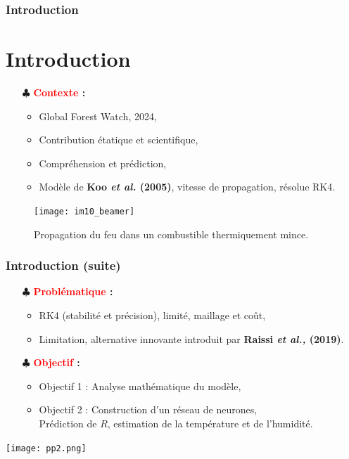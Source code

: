 \documentclass[handout]{beamer}
\newtheorem{pbm et hypo}[thm]{Problématique et hypothèses}
\begin{document}
	\begin{frame}
		\frametitle{\textbf{Introduction}}
		\section{Introduction}
		\begin{itemize}
			\item[$\clubsuit$] \textbf{\textcolor{red}{Contexte} : } 
			\begin{itemize}
				\item Global Forest Watch, 2024,  
				\item Contribution étatique et scientifique, 
				\item Compréhension et prédiction, \pause
				\item Modèle de \textbf{Koo \textit{et al.} (2005)}, vitesse de propagation, résolue RK4. 
			\end{itemize}
		\end{itemize}
		\pause[1]
		\begin{figure}
			\centering
			\texttt{[image: im10\_beamer]}
			\caption{Propagation du feu dans un combustible thermiquement mince.}
		\end{figure}
	\end{frame}
	\begin{frame}
		\frametitle{\textbf{Introduction (suite)}}
		\begin{itemize}
			\item[$\clubsuit$] \textbf{\textcolor{red}{Problématique} : } \pause
			\begin{itemize}
				\item RK4 (stabilité et précision), limité, maillage et coût, \pause
				\item Limitation, alternative innovante introduit par \textbf{Raissi \textit{et al.,} (2019)}.
			\end{itemize}
		\end{itemize}
		\vspace{1cm}
		\begin{itemize}
			\item[$\clubsuit$] \textbf{\textcolor{red}{Objectif} : } \pause
			\begin{itemize}
				\item Objectif 1 : Analyse mathématique du modèle, \pause
				\item Objectif 2 : Construction d'un réseau de neurones, \\
				 Prédiction de $R$, estimation de la température et de l'humidité.
			\end{itemize}
		\end{itemize}
	\end{frame}
	\begin{frame}[plain]
		\noindent
		\texttt{[image: pp2.png]}
	\end{frame}
	
\end{document}
